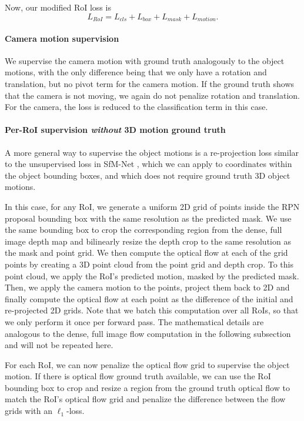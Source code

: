 Now, our modified RoI loss is
\begin{equation}
L_{RoI} = L_{cls} + L_{box} + L_{mask} + L_{motion}.
\end{equation}

\paragraph{Camera motion supervision}
We supervise the camera motion with ground truth analogously to the
object motions, with the only difference being that we only have
a rotation and translation, but no pivot term for the camera motion.
If the ground truth shows that the camera is not moving, we again do not
penalize rotation and translation. For the camera, the loss is reduced to the
classification term in this case.

\paragraph{Per-RoI supervision \emph{without} 3D motion ground truth}
A more general way to supervise the object motions is a re-projection
loss similar to the unsupervised loss in SfM-Net \cite{SfmNet},
which we can apply to coordinates within the object bounding boxes,
and which does not require ground truth 3D object motions.

In this case, for any RoI, we generate a uniform 2D grid of points inside the RPN proposal bounding box
with the same resolution as the predicted mask. We use the same bounding box
to crop the corresponding region from the dense, full image depth map
and bilinearly resize the depth crop to the same resolution as the mask and point
grid.
We then compute the optical flow at each of the grid points by creating
a 3D point cloud from the point grid and depth crop. To this point cloud, we
apply the RoI's predicted motion, masked by the predicted mask.
Then, we apply the camera motion to the points, project them back to 2D
and finally compute the optical flow at each point as the difference of the initial and re-projected 2D grids.
Note that we batch this computation over all RoIs, so that we only perform
it once per forward pass. The mathematical details are analogous to the
dense, full image flow computation in the following subsection and will not
be repeated here. 

For each RoI, we can now penalize the optical flow grid to supervise the object motion.
If there is optical flow ground truth available, we can use the RoI bounding box to
crop and resize a region from the ground truth optical flow to match the RoI's
optical flow grid and penalize the difference between the flow grids with an $\ell_1$-loss.

